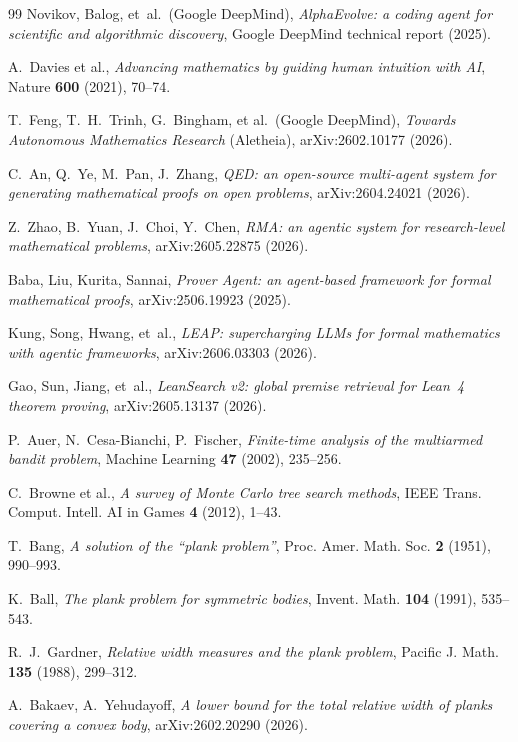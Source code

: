 \documentclass[11pt]{amsart}
\theoremstyle{definition}
\theoremstyle{remark}
\begin{document}
\begin{thebibliography}{99}
 Novikov, Balog, et~al.\ (Google DeepMind),
\emph{AlphaEvolve: a coding agent for scientific and algorithmic discovery},
Google DeepMind technical report (2025).

 A.~Davies et al., \emph{Advancing mathematics by guiding
human intuition with AI}, Nature \textbf{600} (2021), 70--74.

 T.~Feng, T.~H.~Trinh, G.~Bingham, et al.\ (Google
DeepMind), \emph{Towards Autonomous Mathematics Research} (Aletheia),
arXiv:2602.10177 (2026).

 C.~An, Q.~Ye, M.~Pan, J.~Zhang, \emph{QED: an open-source
multi-agent system for generating mathematical proofs on open problems},
arXiv:2604.24021 (2026).

 Z.~Zhao, B.~Yuan, J.~Choi, Y.~Chen, \emph{RMA: an agentic system
for research-level mathematical problems}, arXiv:2605.22875 (2026).

 Baba, Liu, Kurita, Sannai, \emph{Prover Agent: an
agent-based framework for formal mathematical proofs}, arXiv:2506.19923 (2025).

 Kung, Song, Hwang, et~al., \emph{LEAP: supercharging LLMs for
formal mathematics with agentic frameworks}, arXiv:2606.03303 (2026).

 Gao, Sun, Jiang, et~al., \emph{LeanSearch v2: global
premise retrieval for Lean~4 theorem proving}, arXiv:2605.13137 (2026).

 P.~Auer, N.~Cesa-Bianchi, P.~Fischer, \emph{Finite-time
analysis of the multiarmed bandit problem}, Machine Learning \textbf{47} (2002),
235--256.

 C.~Browne et al., \emph{A survey of Monte Carlo tree search
methods}, IEEE Trans. Comput. Intell. AI in Games \textbf{4} (2012), 1--43.

 T.~Bang, \emph{A solution of the ``plank problem''}, Proc.
Amer. Math. Soc. \textbf{2} (1951), 990--993.

 K.~Ball, \emph{The plank problem for symmetric bodies}, Invent.
Math. \textbf{104} (1991), 535--543.

 R.~J.~Gardner, \emph{Relative width measures and the plank
problem}, Pacific J. Math. \textbf{135} (1988), 299--312.

 A.~Bakaev, A.~Yehudayoff, \emph{A lower bound for the total
relative width of planks covering a convex body}, arXiv:2602.20290 (2026).


\end{thebibliography}
\end{document}
